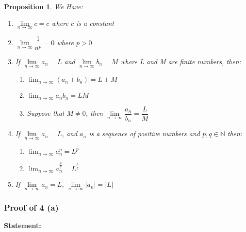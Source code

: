 \documentclass[12pt]{book}
\newtheorem{prop}{Proposition}
\theoremstyle{definition}
\begin{document}
\begin{prop} We Have:

\begin{enumerate}
\item $\lim\limits_{n \to \infty}{c} = c$ where $c$ is a constant %
\item $\lim\limits_{n\to \infty} \dfrac{1}{n^p} = 0$ where $p > 0$  %
\item If $\lim\limits_{n \to \infty}{a_n}=  L$ and $\lim\limits_{n \to \infty}{b_n}=  M$ where L and M are finite numbers, then: %
 \begin{enumerate}
 \item $\lim_{n \to \infty}{(a_n \pm b_n )} = L \pm M$ %
 \item  $\lim_{n \to \infty}{a_nb_n}=  LM$ %
 \item Suppose that $M \neq 0$, then $ \lim\limits_{n \to \infty}{\dfrac{a_n}{b_n} = \dfrac{L}{M}} $ %
 \end{enumerate}
\item If $\lim\limits_{n \to \infty}{a_n}=  L$, and $a_n$ is a sequence of positive numbers and $p,q \in \mathbb{N}$ then: %
\begin{enumerate}
\item $\lim_{n \to \infty}a_n^p = L^p$ %
\item $\lim_{n \to \infty}a_n^{\frac{p}{q}} = L^{\frac{p}{q}}$
\end{enumerate}
\item If $\lim\limits_{n \to \infty}{a_n}=  L$, $\lim\limits_{n \to \infty}{|a_n|}=  |L|$
\end{enumerate}

	
\end{prop}



\subsubsection{Proof of 4 (a)}
\label{proof_seq_power_limit}
\textbf{Statement:}
\end{document}
